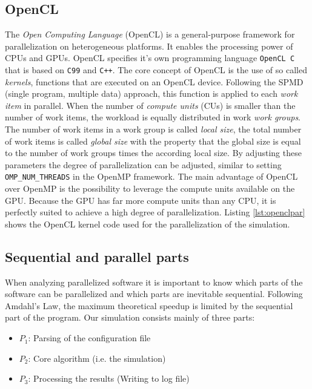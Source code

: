 \documentclass[a4paper,11pt]{scrartcl} %
\begin{document}
\subsection{OpenCL}
The \textit{Open Computing Language} (OpenCL) is a general-purpose framework for parallelization on heterogeneous platforms. It enables the processing power of CPUs and GPUs. OpenCL specifies it's own programming language \texttt{OpenCL C} that is based on \texttt{C99} and \texttt{C++}. The core concept of OpenCL is the use of so called \textit{kernels}, functions that are executed on an OpenCL device. Following the SPMD (single program, multiple data) approach, this function is applied to each \textit{work item} in parallel. When the number of \textit{compute units} (CUs) is smaller than the number of work items, the workload is equally distributed in work \textit{work groups}. The number of work items in a work group is called \textit{local size}, the total number of work items is called \textit{global size} with the property that the global size is equal to the number of work groups times the according local size. By adjusting these parameters the degree of parallelization can be adjusted, similar to setting \texttt{OMP\_NUM\_THREADS} in the OpenMP framework. The main advantage of OpenCL over OpenMP is the possibility to leverage the compute units available on the GPU. Because the GPU has far more compute units than any CPU, it is perfectly suited to achieve a high degree of parallelization. Listing \ref{lst:openclpar} shows the OpenCL kernel code used for the parallelization of the simulation.

\subsection{Sequential and parallel parts}
When analyzing parallelized software it is important to know which parts of the software can be parallelized and which parts are inevitable sequential. Following Amdahl's Law, the maximum theoretical speedup is limited by the sequential part of the program. Our simulation consists mainly of three parts:

\begin{itemize}
  \item $P_1$: Parsing of the configuration file
  \item $P_2$: Core algorithm (i.e. the simulation)
  \item $P_3$: Processing the results (Writing to log file)
\end{itemize}
\end{document}

